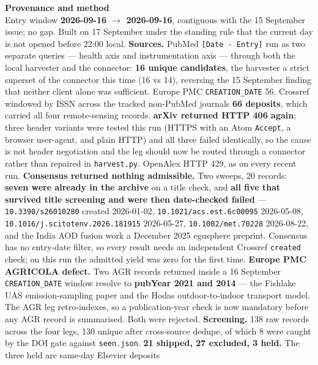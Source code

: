 \documentclass[10pt]{article}
\begin{document}
\vspace{4mm}
\begin{keybox}
{\sffamily\bfseries\footnotesize\color{Deep}Provenance and method}\\[1.2mm]
{\fontsize{7.2}{8.8}\selectfont
Entry window \textbf{2026-09-16 $\to$ 2026-09-16}, contiguous with the 15 September issue;
no gap. Built on 17 September under the standing rule that the current day is not opened
before 22:00 local.
\textbf{Sources.} PubMed \texttt{[Date - Entry]} run as two separate queries --- health
axis and instrumentation axis --- through both the local harvester and the connector:
\textbf{16 unique candidates}, the harvester a strict superset of the connector this time
(16 vs 14), reversing the 15 September finding that neither client alone was sufficient.
Europe PMC \texttt{CREATION\_DATE} 56. Crossref windowed by ISSN across the tracked
non-PubMed journals \textbf{66 deposits}, which carried all four remote-sensing records.
\textbf{arXiv returned HTTP 406 again}; three header variants were tested this run
(HTTPS with an Atom \texttt{Accept}, a browser user-agent, and plain HTTP) and all three
failed identically, so the cause is not header negotiation and the leg should now be
routed through a connector rather than repaired in \texttt{harvest.py}. OpenAlex HTTP 429,
as on every recent run.
\textbf{Consensus returned nothing admissible.} Two sweeps, 20 records: \textbf{seven were
already in the archive} on a title check, and \textbf{all five that survived title
screening and were then date-checked failed} --- \texttt{10.3390/s26010280} created
2026-01-02, \texttt{10.1021/acs.est.6c00095} 2026-05-08,
\texttt{10.1016/j.scitotenv.2026.181915} 2026-05-27, \texttt{10.1002/met.70228}
2026-08-22, and the India AOD fusion work a December 2025 egusphere preprint. Consensus
has no entry-date filter, so every result needs an independent Crossref \texttt{created}
check; on this run the admitted yield was zero for the first time.
\textbf{Europe PMC AGRICOLA defect.} Two AGR records returned inside a 16 September
\texttt{CREATION\_DATE} window resolve to \textbf{pubYear 2021 and 2014} --- the Fishlake
UAS emission-sampling paper and the Hodas outdoor-to-indoor transport model. The AGR leg
retro-indexes, so a publication-year check is now mandatory before any AGR record is
summarised. Both were rejected.
\textbf{Screening.} 138 raw records across the four legs, 130 unique after cross-source
dedupe, of which 8 were caught by the DOI gate against \texttt{seen.json}.
\textbf{21 shipped, 27 excluded, 3 held.} The three held are same-day Elsevier deposits
}
\end{keybox}
\end{document}
